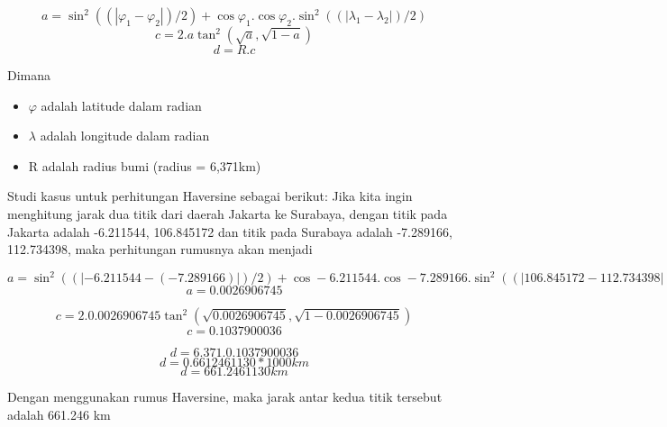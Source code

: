 \begin{displaymath}
	a = \sin^{2}((|\varphi_{1}-\varphi_{2}|)/2) + \cos\varphi_{1} . \cos\varphi_{2} . \sin^{2}((|\lambda_{1}-\lambda_{2}|)/2)
\end{displaymath}
\begin{displaymath}
	c = 2 . a\tan^{2}(\sqrt{a}, \sqrt{1-a})
\end{displaymath}
\begin{displaymath}
	d = R . c
\end{displaymath}

Dimana 
\begin{itemize}
	\item $\varphi$ adalah latitude dalam radian
	\item $\lambda$ adalah longitude dalam radian
	\item R adalah radius bumi (radius = 6,371km)
\end{itemize}

Studi kasus untuk perhitungan Haversine sebagai berikut:
Jika kita ingin menghitung jarak dua titik dari daerah Jakarta ke Surabaya, dengan titik pada Jakarta adalah -6.211544, 106.845172 dan titik pada Surabaya adalah -7.289166, 112.734398, maka perhitungan rumusnya akan menjadi

\begin{displaymath}
	a = \sin^{2}((|-6.211544-(-7.289166)|)/2) + \cos-6.211544 . \cos-7.289166 . \sin^{2}((|106.845172-112.734398|)/2)
\end{displaymath}
\begin{displaymath}
	a = 0.0026906745
\end{displaymath}

\begin{displaymath}
	c = 2 . 0.0026906745\tan^{2}(\sqrt{0.0026906745}, \sqrt{1-0.0026906745})
\end{displaymath}
\begin{displaymath}
	c =  0.1037900036
\end{displaymath}

\begin{displaymath}
	d = 6.371 . 0.1037900036
\end{displaymath}
\begin{displaymath}
	d = 0.6612461130 * 1000 km
\end{displaymath}
\begin{displaymath}
	d = 661.2461130 km
\end{displaymath}

Dengan menggunakan rumus Haversine, maka jarak antar kedua titik tersebut adalah 661.246 km
